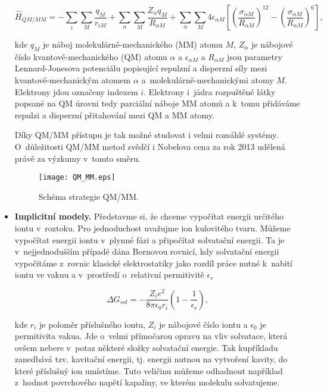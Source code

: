 \begin{itemize}
\begin{equation}
\hat{H}_{QM/MM} = - \sum_i \sum_M \frac{q_M}{r_{iM}} + \sum_{\alpha} \sum_M \frac{Z_{\alpha} q_M}{R_{\alpha M}} + \sum_{\alpha} \sum_M 4 \epsilon_{\alpha M} \left[ \left( \frac{\sigma_{\alpha M}}{R_{\alpha M}} \right)^{12} - \left( \frac{\sigma_{\alpha M}}{R_{\alpha M}} \right)^6 \right],
\label{rov:Sol-2}
\end{equation}

\noindent
kde $q_M$ je náboj molekulárně-mechanického (MM) atomu $M$, $Z_{\alpha}$ je nábojové číslo kvan\-tově-mechanického (QM) atomu $\alpha$ a $\epsilon_{\alpha M}$ a $R_{\alpha M}$ jsou parametry Lennard-Jonesova potenciálu popisující repulzní a disperzní síly mezi kvantově-mechanickým atomem $\alpha$ a~mole\-ku\-lárně-mechanickými atomy $M$. Elektrony jdou označeny indexem $i$. Elektrony i~jádra rozpuštěné látky popsané na QM úrovni tedy  parciální náboje MM atomů a k~tomu přidáváme repulzi a disperzní přitahování mezi QM a MM atomy. 

Díky QM/MM přístupu je tak možné studovat i velmi rozsáhlé systémy. O~důležitosti QM/MM metod svědčí i Nobelova cena za rok 2013 udělená právě za výzkumy v~tomto směru. 

\begin{figure} [htb]
\centering
\texttt{[image: QM\_MM.eps]}
\caption{Schéma strategie QM/MM.}
\label{obr:QM_MM}
\end{figure}


\item \textbf{Implicitní modely.} Představme si, že chceme vypočítat energii určitého iontu v~roztoku. Pro jednoduchost uvažujme ion kulovitého tvaru. Můžeme vypočítat energii iontu v~plynné fázi a připočítat solvatační energii. Ta je v~nejjednodušším případě dána Bornovou rovnicí, kdy solvatační energii vypočítáme z~rovnic klasické elektrostatiky jako rozdíl práce nutné k~nabití iontu ve vakuu a v~prostředí o~relativní permitivitě $\epsilon_r$


\begin{equation}
\Delta G_{sol} = - \frac{Z_i e^2}{8 \pi \epsilon_0 r_i} \left(1- \frac{1}{\epsilon_r} \right),
\label{rov:Sol-3}
\end{equation}

\noindent kde $r_i$ je poloměr příslušného iontu, $Z_i$ je nábojové číslo iontu a $\epsilon_0$  je permitivita vakua. Jde o~velmi přímočarou opravu na vliv solvatace, která ovšem nebere v~potaz některé složky solvatační energie. Tak kupříkladu zanedbává tzv. kavitační energii, tj. energii nutnou na vytvoření kavity, do které příslušný ion umístíme. Tuto veličinu můžeme odhadnout například z~hodnot povrchového napětí kapaliny, ve kterém molekulu solvatujeme. 


\end{itemize}
